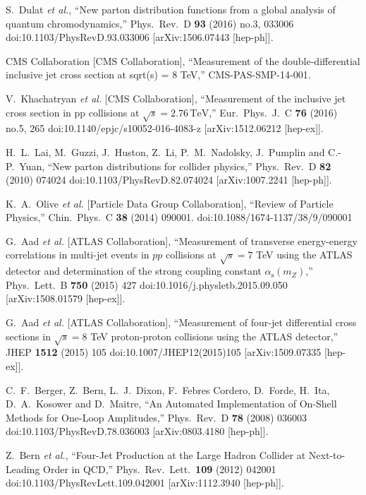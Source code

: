 \documentclass{PoS}
\begin{document}
\begin{thebibliography}{99}
  S.~Dulat {\it et al.},
  ``New parton distribution functions from a global analysis of quantum chromodynamics,''
  Phys.\ Rev.\ D {\bf 93} (2016) no.3,  033006
  doi:10.1103/PhysRevD.93.033006
  [arXiv:1506.07443 [hep-ph]].

  CMS Collaboration [CMS Collaboration],
  ``Measurement of the double-differential inclusive jet cross section at sqrt(s) = 8 TeV,''
  CMS-PAS-SMP-14-001.

  V.~Khachatryan {\it et al.} [CMS Collaboration],
  ``Measurement of the inclusive jet cross section in pp collisions at $\sqrt{s} = 2.76\,\text {TeV}$,''
  Eur.\ Phys.\ J.\ C {\bf 76} (2016) no.5,  265
  doi:10.1140/epjc/s10052-016-4083-z
  [arXiv:1512.06212 [hep-ex]].

  H.~L.~Lai, M.~Guzzi, J.~Huston, Z.~Li, P.~M.~Nadolsky, J.~Pumplin and C.-P.~Yuan,
  ``New parton distributions for collider physics,''
  Phys.\ Rev.\ D {\bf 82} (2010) 074024
  doi:10.1103/PhysRevD.82.074024
  [arXiv:1007.2241 [hep-ph]].

  K.~A.~Olive {\it et al.} [Particle Data Group Collaboration],
  ``Review of Particle Physics,''
  Chin.\ Phys.\ C {\bf 38} (2014) 090001.
  doi:10.1088/1674-1137/38/9/090001

  G.~Aad {\it et al.} [ATLAS Collaboration],
  ``Measurement of transverse energy-energy correlations in multi-jet events in $pp$ collisions at $\sqrt{s} = 7$ TeV using the ATLAS detector and determination of the strong coupling constant $\alpha_{\mathrm{s}}(m_Z)$,''
  Phys.\ Lett.\ B {\bf 750} (2015) 427
  doi:10.1016/j.physletb.2015.09.050
  [arXiv:1508.01579 [hep-ex]]. 

  G.~Aad {\it et al.} [ATLAS Collaboration],
  ``Measurement of four-jet differential cross sections in $\sqrt{s}=8$ TeV proton-proton collisions using the ATLAS detector,''
  JHEP {\bf 1512} (2015) 105
  doi:10.1007/JHEP12(2015)105
  [arXiv:1509.07335 [hep-ex]].

  C.~F.~Berger, Z.~Bern, L.~J.~Dixon, F.~Febres Cordero, D.~Forde, H.~Ita, D.~A.~Kosower and D.~Maitre,
  ``An Automated Implementation of On-Shell Methods for One-Loop Amplitudes,''
  Phys.\ Rev.\ D {\bf 78} (2008) 036003
  doi:10.1103/PhysRevD.78.036003
  [arXiv:0803.4180 [hep-ph]].

  Z.~Bern {\it et al.},
  ``Four-Jet Production at the Large Hadron Collider at Next-to-Leading Order in QCD,''
  Phys.\ Rev.\ Lett.\  {\bf 109} (2012) 042001
  doi:10.1103/PhysRevLett.109.042001
  [arXiv:1112.3940 [hep-ph]].


\end{thebibliography}
\end{document}
